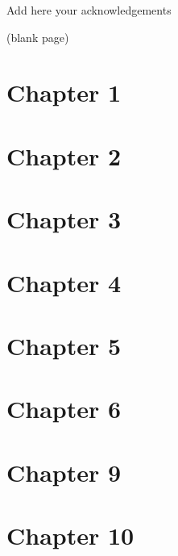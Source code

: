 \begin{justify}
\vspace{0.1 in}
\noindent

Add here your acknowledgements


\clearpage
\thispagestyle{plain}
(blank page)





\clearpage
\chapter{\fontsize{24pt}{20pt}\selectfont \textbf{Chapter 1}}


\clearpage
\chapter{\fontsize{24pt}{20pt}\selectfont \textbf{Chapter 2}}


\clearpage
\chapter{\fontsize{24pt}{20pt}\selectfont \textbf{Chapter 3}}


\clearpage
\chapter{\fontsize{24pt}{20pt}\selectfont \textbf{Chapter 4}}


\clearpage
\chapter{\fontsize{24pt}{20pt}\selectfont \textbf{Chapter 5}}


\clearpage
\chapter{\fontsize{24pt}{20pt}\selectfont \textbf{Chapter 6}}



\clearpage
\chapter{\fontsize{24pt}{20pt}\selectfont \textbf{Chapter 9}}


\clearpage
\chapter{\fontsize{24pt}{20pt}\selectfont \textbf{Chapter 10}}



\clearpage




\end{justify}

\endinput

